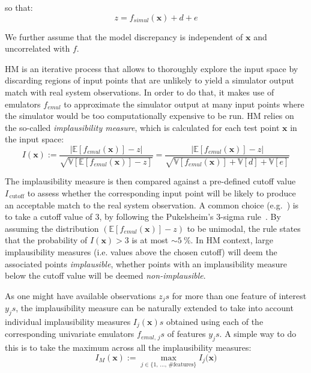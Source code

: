\noindent
so that:
%
\begin{equation}
z = f_{simul}(\mathbf{x}) + d + e
\end{equation}

\noindent
We further assume that the model discrepancy is independent of $\mathbf{x}$ and uncorrelated with $f$.

\vspace{0.2cm}
HM is an iterative process that allows to thoroughly explore the input space by discarding regions of input points that are unlikely to yield a simulator output match with real system observations. In order to do that, it makes use of emulators $f_{emul}$ to approximate the simulator output at many input points where the simulator would be too computationally expensive to be run. HM relies on the so-called \textit{implausibility measure}, which is calculated for each test point $\mathbf{x}$ in the input space:
%
\begin{equation}\label{eq:implmeasure}
    I(\mathbf{x}) := \frac{\lvert\mathbb{E}[f_{emul}(\mathbf{x})]-z\rvert}{\sqrt{\mathbb{V}[\mathbb{E}[f_{emul}(\mathbf{x})]-z]}} = \frac{\lvert\mathbb{E}[f_{emul}(\mathbf{x})]-z\rvert}{\sqrt{\mathbb{V}[f_{emul}(\mathbf{x})] + \mathbb{V}[d] + \mathbb{V}[e]}}
\end{equation}

\noindent
The implausibility measure is then compared against a pre-defined cutoff value $I_{\,\text{cutoff}}$ to assess whether the corresponding input point will be likely to produce an acceptable match to the real system observation. A common choice (e.g.~\cite{Vernon:2010,Andrianakis:2015,Coveney:2018}) is to take a cutoff value of $3$, by following the Pukelsheim's $3$-sigma rule~\cite{Pukelsheim:1994}. By assuming the distribution $(\mathbb{E}[f_{emul}(\mathbf{x})]-z)$ to be unimodal, the rule states that the probability of $I(\mathbf{x})>3$ is at most $\sim\SI{5}{\percent}$. In HM context, large implausibility measures (i.e. values above the chosen cutoff) will deem the associated points \textit{implausible}, whether points with an implausibility measure below the cutoff value will be deemed \textit{non-implausible}. 

\vspace{0.2cm}
As one might have available observations $z_js$ for more than one feature of interest $y_js$, the implausibility measure can be naturally extended to take into account individual implausibility measures $I_j(\mathbf{x})s$ obtained using each of the corresponding univariate emulators $f_{emul,\,j}s$ of features $y_js$. A simple way to do this is to take the maximum across all the implausibility measures: 
%
\begin{equation}\label{eq:maximplmeasure}
    I_{M}(\mathbf{x}) := \max_{j\in\{1,\,\dots,\,\#\textrm{features}\}}{I_j(\mathbf{x}})
\end{equation}

